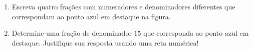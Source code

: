 \documentclass[a4,12pt]{book}
\begin{document}
\begin{enumerate} [\quad a)]
\begin{center}
\end{center}
  \item     Escreva quatro frações com numeradores e denominadores diferentes que correspondam ao ponto azul em destaque na figura.
  \item     Determine uma fração de denominador     $15$     que corresponda ao ponto azul em destaque. Justifique sua resposta usando uma reta numérica!
\end{enumerate} %
\end{document}
